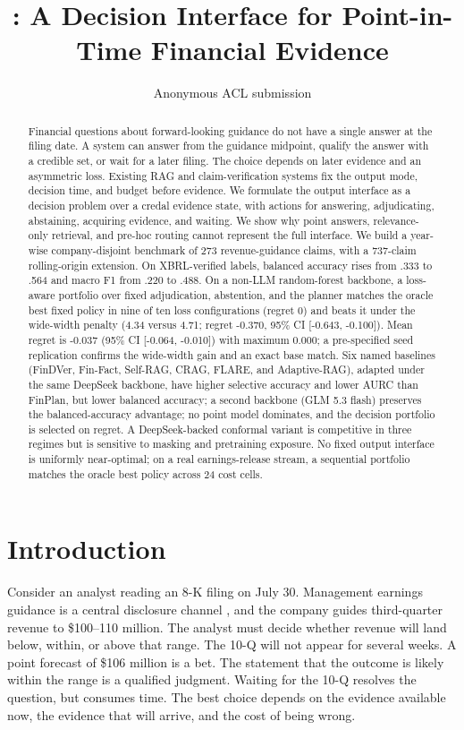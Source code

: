 \documentclass[11pt]{article}
\title{\method: A Decision Interface for Point-in-Time Financial Evidence}
\author{Anonymous ACL submission}
\begin{document}
\sloppy
\maketitle

\begin{abstract}
Financial questions about forward-looking guidance do not have a single answer at the filing date. A system can answer from the guidance midpoint, qualify the answer with a credible set, or wait for a later filing. The choice depends on later evidence and an asymmetric loss. Existing RAG and claim-verification systems fix the output mode, decision time, and budget before evidence. We formulate the output interface as a decision problem over a credal evidence state, with actions for answering, adjudicating, abstaining, acquiring evidence, and waiting. We show why point answers, relevance-only retrieval, and pre-hoc routing cannot represent the full interface. We build a year-wise company-disjoint benchmark of 273 revenue-guidance claims, with a 737-claim rolling-origin extension. On XBRL-verified labels, balanced accuracy rises from .333 to .564 and macro F1 from .220 to .488. On a non-LLM random-forest backbone, a loss-aware portfolio over fixed adjudication, abstention, and the planner matches the oracle best fixed policy in nine of ten loss configurations (regret 0) and beats it under the wide-width penalty (4.34 versus 4.71; regret -0.370, 95\% CI [-0.643, -0.100]). Mean regret is -0.037 (95\% CI [-0.064, -0.010]) with maximum 0.000; a pre-specified seed replication confirms the wide-width gain and an exact base match. Six named baselines (FinDVer, Fin-Fact, Self-RAG, CRAG, FLARE, and Adaptive-RAG), adapted under the same DeepSeek backbone, have higher selective accuracy and lower AURC than FinPlan, but lower balanced accuracy; a second backbone (GLM 5.3 flash) preserves the balanced-accuracy advantage; no point model dominates, and the decision portfolio is selected on regret. A DeepSeek-backed conformal variant is competitive in three regimes but is sensitive to masking and pretraining exposure. No fixed output interface is uniformly near-optimal; on a real earnings-release stream, a sequential portfolio matches the oracle best policy across 24 cost cells.
\end{abstract}

\section{Introduction}

Consider an analyst reading an 8-K filing on July 30. Management earnings guidance is a central disclosure channel \citep{hirst2008management}, and the company guides third-quarter revenue to \$100--110 million. The analyst must decide whether revenue will land below, within, or above that range. The 10-Q will not appear for several weeks. A point forecast of \$106 million is a bet. The statement that the outcome is likely within the range is a qualified judgment. Waiting for the 10-Q resolves the question, but consumes time. The best choice depends on the evidence available now, the evidence that will arrive, and the cost of being wrong.
\end{document}
